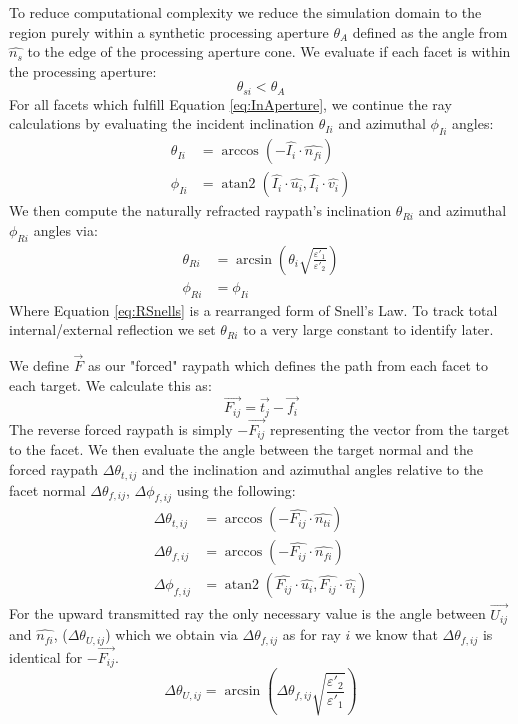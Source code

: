 \documentclass[lettersize,journal]{IEEEtran}
\begin{document}
To reduce computational complexity we reduce the simulation domain to the region purely within a synthetic processing aperture $\theta_A$ defined as the angle from $\hat{n_s}$ to the edge of the processing aperture cone. We evaluate if each facet is within the processing aperture:
\begin{equation}\label{eq:InAperture}
    \theta_{si} < \theta_A 
\end{equation}
For all facets which fulfill Equation \ref{eq:InAperture}, we continue the ray calculations by evaluating the incident inclination $\theta_{Ii}$ and azimuthal $\phi_{Ii}$ angles:
\begin{align}
    \theta_{Ii} &= \arccos\left(-\hat{I_{i}}\cdot\hat{n_{fi}}\right) \\
    \phi_{Ii} &= \operatorname{atan2}(\hat{I_{i}}\cdot\hat{u_i}, \hat{I_{i}}\cdot\hat{v_i})
\end{align}
We then compute the naturally refracted raypath's inclination $\theta_{Ri}$ and azimuthal $\phi_{Ri}$ angles via:
\begin{align}
    \label{eq:RSnells}
    \theta_{Ri} &= \arcsin\left(\theta_{i}\sqrt{\frac{\varepsilon'_1}{\varepsilon'_2}}\right) \\
    \phi_{Ri} &= \phi_{Ii}
\end{align}
Where Equation \ref{eq:RSnells} is a rearranged form of Snell's Law. To track total internal/external reflection we set $\theta_{Ri}$ to a very large constant to identify later.

We define $\vec{F}$ as our "forced" raypath which defines the path from each facet to each target. We calculate this as:
\begin{equation}
    \vec{F_{ij}}=\vec{t_j}-\vec{f_i}
\end{equation}
The reverse forced raypath is simply $-\vec{F_{ij}}$ representing the vector from the target to the facet. We then evaluate the angle between the target normal and the forced raypath $\Delta\theta_{t,ij}$ and the inclination and azimuthal angles relative to the facet normal $\Delta\theta_{f,ij}$, $\Delta\phi_{f,ij}$ using the following: 
\begin{align}
    \Delta\theta_{t,ij} &= \arccos\left(-\hat{F_{ij}}\cdot\hat{n_{ti}}\right) \\
    \Delta\theta_{f,ij} &= \arccos\left(-\hat{F_{ij}}\cdot\hat{n_{fi}}\right) \\
    \Delta\phi_{f,ij} &= \operatorname{atan2}(\hat{F_{ij}}\cdot\hat{u_i}, \hat{F_{ij}}\cdot\hat{v_i})
\end{align}
For the upward transmitted ray the only necessary value is the angle between $\vec{U_{ij}}$ and  $\hat{n_{fi}}$, ($\Delta\theta_{U,ij}$) which we obtain via $\Delta\theta_{f,ij}$ as for ray $i$ we know that $\Delta\theta_{f,ij}$ is identical for $-\vec{F_{ij}}$. 
\begin{equation}
    \Delta\theta_{U,ij} = \arcsin\left(\Delta\theta_{f,ij}\sqrt{\frac{\varepsilon'_2}{\varepsilon'_1}}\right)
\end{equation}
\end{document}
